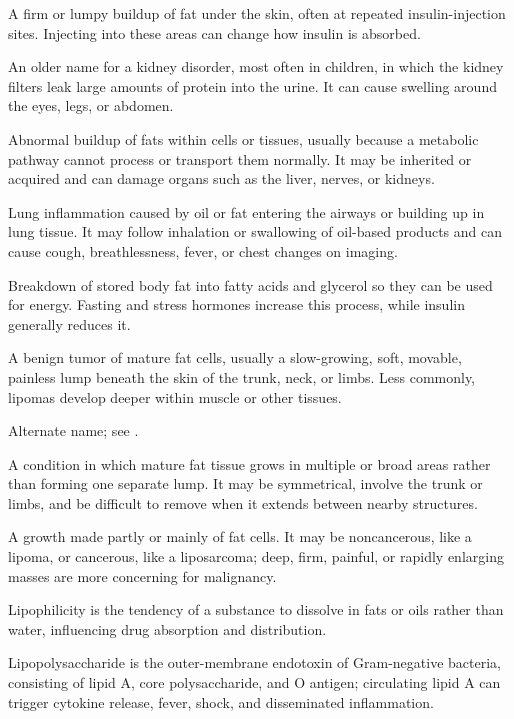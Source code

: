  A firm or lumpy buildup of fat under the skin, often at repeated insulin-injection sites. Injecting into these areas can change how insulin is absorbed.

 An older name for a kidney disorder, most often in children, in which the kidney filters leak large amounts of protein into the urine. It can cause swelling around the eyes, legs, or abdomen.

 Abnormal buildup of fats within cells or tissues, usually because a metabolic pathway cannot process or transport them normally. It may be inherited or acquired and can damage organs such as the liver, nerves, or kidneys.

 Lung inflammation caused by oil or fat entering the airways or building up in lung tissue. It may follow inhalation or swallowing of oil-based products and can cause cough, breathlessness, fever, or chest changes on imaging.

 Breakdown of stored body fat into fatty acids and glycerol so they can be used for energy. Fasting and stress hormones increase this process, while insulin generally reduces it.

 A benign tumor of mature fat cells, usually a slow-growing, soft, movable, painless lump beneath the skin of the trunk, neck, or limbs. Less commonly, lipomas develop deeper within muscle or other tissues.


 Alternate name; see .

 A condition in which mature fat tissue grows in multiple or broad areas rather than forming one separate lump. It may be symmetrical, involve the trunk or limbs, and be difficult to remove when it extends between nearby structures.

 A growth made partly or mainly of fat cells. It may be noncancerous, like a lipoma, or cancerous, like a liposarcoma; deep, firm, painful, or rapidly enlarging masses are more concerning for malignancy.

 Lipophilicity is the tendency of a substance to dissolve in fats or oils rather than water, influencing drug absorption and distribution.

 Lipopolysaccharide is the outer-membrane endotoxin of Gram-negative bacteria, consisting of lipid A, core polysaccharide, and O antigen; circulating lipid A can trigger cytokine release, fever, shock, and disseminated inflammation.

